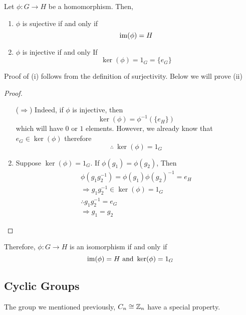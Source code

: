 \documentclass{article}
\begin{document}
\begin{prop}
    Let $\phi : G \rightarrow H$ be a homomorphism. Then,
    \begin{enumerate}
        \item $\phi$ is sujective if and only if
        \[
            \operatorname{im}(\phi) = H    
        \]
        \item $\phi$ is injective if and only If
        \[
            \ker(\phi) = 1_G = \{e_G\}
        \]
    \end{enumerate}
\end{prop}

Proof of (i) follows from the definition of surjectivity. Below we will prove (ii)

\begin{proof}\leavevmode
    \begin{enumerate}
        \item[($\Rightarrow$)] Indeed, if $\phi$ is injective, then
        \[
            \ker(\phi) = \phi^{-1}(\{e_H\})
        \]
        which will have $0$ or $1$ elements. However, we already know that $e_G \in \ker(\phi)$ therefore
        \[
            \therefore \ \ker(\phi) = 1_G
        \]

        \item Suppose $\ker(\phi) = 1_G$. If $\phi(g_1) = \phi(g_2)$, Then
        \begin{align*}
            \phi(g_1g_2^{-1}) = \phi(g_1)\phi(g_2)^{-1} = e_H \\
            \Rightarrow g_1g_2^{-1} \in \ker(\phi) = 1_G \\
            \therefore g_1g_2^{-1} = e_G \\
            \Rightarrow g_1 = g_2
        \end{align*}
    \end{enumerate}
\end{proof}

\begin{prop}
    Therefore, $\phi: G \rightarrow H$ is an isomorphism if and only if
    \[
        \operatorname{im}(\phi) = H \ \text{and} \ \ker(\phi) = 1_G  
    \]
\end{prop}

\subsection{Cyclic Groups}

The group we mentioned previously, $C_n \cong \mathbb{Z}_n$ have a special property.
\end{document}
